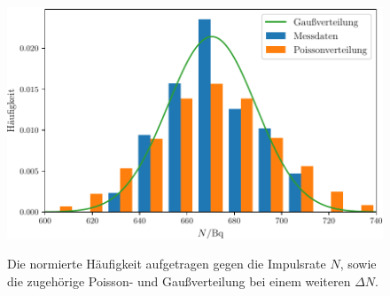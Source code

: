 \begin{figure}
	\centering
	\caption{Die normierte Häufigkeit aufgetragen gegen die Impulsrate $N$, sowie die zugehörige Poisson- und Gaußverteilung bei einem weiteren $\Delta N$.}
	\includegraphics[width=\linewidth-70pt,height=\textheight-70pt,keepaspectratio]{content/images/Graph3_scott.pdf}
	\label{fig:3_scott}
\end{figure}
